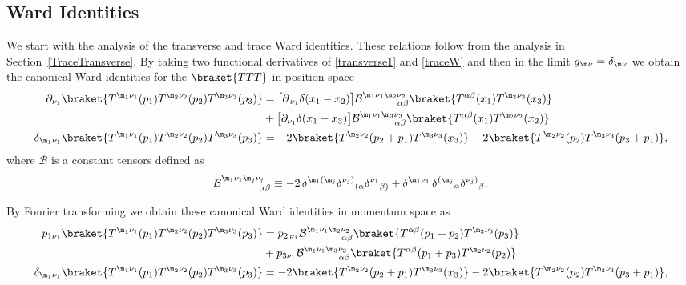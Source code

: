 \documentclass[a4paper,11pt,openright,twoside]{book}
\let\a=\alpha   \let\b=\beta   \let\g=\gamma   \let\d=\delta
\let\n=\nu      \let\x=\xi     \let\p=\pi      \let\r=\rho
\newcommand{\secref}[1]{Section~\ref{#1}}		%
\numberwithin{equation}{section}
\begin{document}
{{{\subsection{Ward Identities}
We start with the analysis of the transverse and trace Ward identities. These relations follow from the analysis in \secref{TraceTransverse}. By taking two functional derivatives of \eqref{transverse1} and \eqref{traceW} and then in the limit $g_{\m\n}=\d_{\m\n}$ we obtain the canonical Ward identities for the $\braket{TTT}$ in position space
\begin{align}
	\partial_{\n_1}\braket{T^{\m_1\n_1}(p_1)T^{\m_2\n_2}(p_2)T^{\m_3\n_3}(p_3)}&=\big[\partial_{\,\n_1}\d(x_1-x_2)\big]\mathcal{B}^{\m_1\n_1\m_2\n_2}_{\hspace{1.1cm}\a\b}\braket{T^{\a\b}(x_1)T^{\m_3\n_3}(x_3)}\notag\\
	&+\big[\partial_{\n_1}\d(x_1-x_3)\big]\mathcal{B}^{\m_1\n_1\m_3\n_3}_{\hspace{1.1cm}\a\b}\braket{T^{\a\b}(x_1)T^{\m_2\n_2}(x_2)}\notag\\
	\d_{\m_1\n_1}\braket{T^{\m_1\n_1}(p_1)T^{\m_2\n_2}(p_2)T^{\m_3\n_3}(p_3)}&=-2\braket{T^{\m_2\n_2}(p_2+p_1)T^{\m_3\n_3}(x_3)}-2\braket{T^{\m_2\n_2}(p_2)T^{\m_3\n_3}(p_3+p_1)},\notag
\end{align}
where $\mathcal B$ is a constant tensors defined as
\begin{equation}
	\mathcal{B}^{\m_1\n_1\m_j\n_j}_{\hspace{1.2cm}\a\b}\equiv -2\, \d^{\m_1(\m_j}  \d{}^{\n_j)}{}_{(\a}\d^{\n_1}{}_{\b)} 
	+ \d^{\m_1\n_1}\,\d^{(\m_j}{}_{\a}  \d^{\n_j)}{}_{\b}.
\end{equation}

By Fourier transforming we obtain these canonical Ward identities in momentum space as
\begin{align}
	p_{1\n_1}\braket{T^{\m_1\n_1}(p_1)T^{\m_2\n_2}(p_2)T^{\m_3\n_3}(p_3)}&=p_{2\,\n_1}\mathcal{B}^{\m_1\n_1\m_2\n_2}_{\hspace{1.1cm}\a\b}\braket{T^{\a\b}(p_1+p_2)T^{\m_3\n_3}(p_3)}\notag\\
	&+p_{3\n_1}\mathcal{B}^{\m_1\n_1\m_3\n_3}_{\hspace{1.1cm}\a\b}\braket{T^{\a\b}(p_1+p_3)T^{\m_2\n_2}(p_2)}\label{transvttt}\\
	\d_{\m_1\n_1}\braket{T^{\m_1\n_1}(p_1)T^{\m_2\n_2}(p_2)T^{\m_3\n_3}(p_3)}&=-2\braket{T^{\m_2\n_2}(p_2+p_1)T^{\m_3\n_3}(x_3)}-2\braket{T^{\m_2\n_2}(p_2)T^{\m_3\n_3}(p_3+p_1)}\label{tracettt},
\end{align}
}}}
\end{document}
